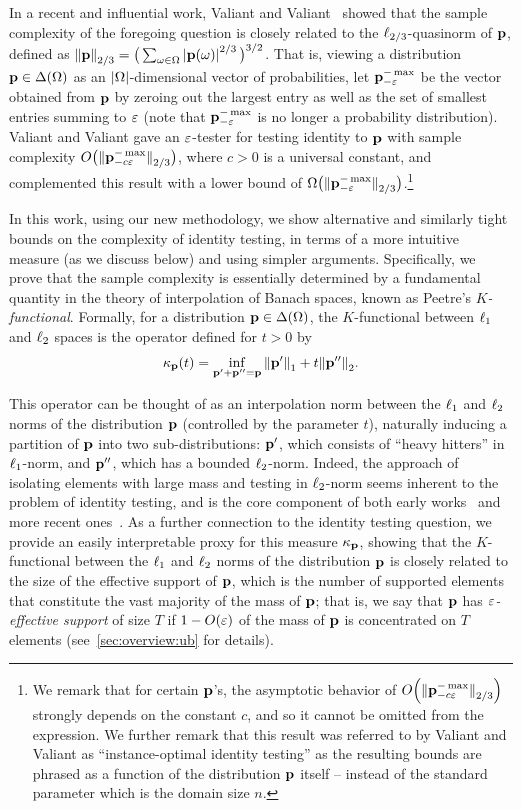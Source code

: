 In a recent and influential work, Valiant and Valiant~\cite{VV:14} showed that the sample complexity of the foregoing question is closely related to the $\lp[2/3]$-quasinorm of $\p$, defined as $\norm{\p}_{2/3} = \big(\sum_{\omega \in \Omega} \abs{\p(\omega)}^{2/3}\big)^{3/2}$. That is, viewing a distribution $\p \in\distribs{\Omega}$ as an $\abs{\Omega}$-dimensional vector of probabilities, let $\p_{-\eps}^{-\max}$ be the vector obtained from $\p$ by zeroing out the largest entry as well as the set of smallest entries summing to $\eps$ (note that $\p_{-\eps}^{-\max}$ is no longer a probability distribution). Valiant and Valiant gave an $\eps$-tester for testing identity to $\p$ with sample complexity $O\big({\norm{\p_{-c \eps}^{-\max}}_{2/3}}\big)$, where $c>0$ is a universal constant, and complemented this result with a lower bound of $\Omega\big({\norm{\p_{-\eps}^{-\max}}_{2/3}}\big)$.\footnote{We remark that for certain $\p$'s, the asymptotic behavior of $\bigO{\norm{\p_{-c\eps}^{-\max}}_{2/3}}$ strongly depends on the constant $c$, and so it cannot be omitted from the expression. We further remark that this result was referred to by Valiant and Valiant  as ``instance-optimal identity testing'' as the resulting bounds are phrased as a function of the distribution $\p$ itself -- instead of the standard parameter which is the domain size $n$.}

In this work, using our new methodology, we show alternative and similarly tight bounds on the complexity of identity testing, in terms of a more intuitive measure (as we discuss below) and using simpler arguments. Specifically, we prove that the sample complexity is essentially determined by a fundamental quantity in the theory of interpolation of Banach spaces, known as Peetre's \emph{$K$-functional}. Formally, for a distribution $\p\in\distribs{\Omega}$, the $K$-functional between $\lp[1]$ and $\lp[2]$ spaces is the operator defined for $t>0$ by
\begin{equation*}
    \kf{\p}(t) = \inf_{\p'+ \p''=\p} \normone{\p'} + t\normtwo{\p''}.
\end{equation*}

This operator can be thought of as an interpolation norm between the $\lp[1]$ and $\lp[2]$ norms of the distribution $\p$ (controlled by the parameter $t$), naturally inducing a partition of $\p$ into two sub-distributions: $\p'$, which consists of ``heavy hitters'' in $\lp[1]$-norm, and $\p''$, which has a bounded $\lp[2]$-norm. Indeed, the approach of isolating elements with large mass and testing in $\lp[2]$-norm seems inherent to the problem of identity testing, and is the core component of both early works~\cite{GRexp:00,BFFKRW:01} and more recent ones~\cite{DKN:15,DK:16,Gol:16}. As a further connection to the identity testing question, we provide an easily interpretable proxy for this measure $\kf{\p}$, showing that the $K$-functional between the $\lp[1]$ and $\lp[2]$ norms of the distribution $\p$ is closely related to the size of the effective support of $\p$, which is the number of supported elements that constitute the vast majority of the mass of $\p$; that is, we say that $\p$ has \emph{$\eps$-effective support} of size $T$ if $1- O(\eps)$ of the mass of $\p$ is concentrated on $T$ elements (see~\cref{sec:overview:ub} for details).

